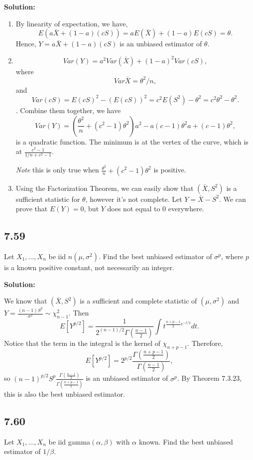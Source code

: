 \documentclass[11pt]{article}
\newcommand{\Sol}{\par {\bf Solution:}}
\newcommand{\sample}[1]{#1_1 , \dots , #1_n}
\begin{document}
\Sol
\begin{enumerate}[label=(\alph*)]
    \item
    By linearity of expectation, we have,
    \[
    E(a\bar X + (1-a)(cS)) = aE(\bar X) + (1-a)E(cS) = \theta.
    \]
    Hence, $Y = a\bar X + (1-a)(cS)$ is an unbiased estimator of $\theta$.
    
    \item
    \[
    Var(Y) = a^2 Var(\bar X) + (1-a)^2Var(cS),
    \]
    where
    \[
    Var \bar X = \theta^2/n,
    \]
    and 
    \[
    Var(cS) = E(cS)^2 - (E(cS))^2 = c^2E(S^2) - \theta^2 = c^2\theta^2 - \theta^2.
    \].
    Combine them together, we have
    \[
    Var(Y) = (\frac{\theta^2}{n} + (c^2-1)\theta^2)a^2 - a(c-1)\theta^2a + (c-1)\theta^2,
    \]
    is a quadratic function.
    The minimum is at the vertex of the curve, which is at $\frac{c^2-1}{1/n + c^2 - 1}$.

    \emph{Note} this is only true when $\frac{\theta^2}{n} + (c^2-1)\theta^2$ is positive.
    \item
    Using the Factorization Theorem, we can easily show that $(\bar X, S^2)$ is a sufficient statistic for $\theta$, however it's not complete. Let $Y = \bar X - S^2$. We can prove that $E(Y) = 0$, but $Y$ does not equal to 0 everywhere.
\end{enumerate}

\subsection*{7.59}
Let $\sample X$ be iid $n(\mu, \sigma^2)$. Find the best unbiased estimator of $\sigma^p$, where $p$ is a known positive constant, not necessarily an integer.

\Sol

We know that $(\bar X, S^2)$ is a sufficient and complete statistic of $(\mu, \sigma^2)$ and $Y = \frac{(n-1)S^2}{\sigma^2} \sim \chi_{n-1}^2$.
Then
\[
E [Y^{p/2}] = \frac{1}{2^{(n-1)/2}\Gamma(\frac{n-1}{2})} \int t^{\frac{n+p-1}{2}e^{-t/2}}dt.
\]
Notice that the term in the integral is the kernel of $\chi_{n+p-1}$. Therefore, 
\[
E[Y^{p/2}] = 2^{p/2}\frac{\Gamma(\frac{n+p-1}{2})}{\Gamma(\frac{n-1}{2})},
\]
so $(n-1)^{p/2}S^p\frac{\Gamma(\frac{n-1}{2})}{\Gamma(\frac{n+p-1}{2})}$ is an unbiased estimator of $\sigma^p$. By Theorem 7.3.23, this is also the best unbiased estimator.

\subsection*{7.60}
Let $\sample X$ be iid gamma$(\alpha, \beta)$ with $\alpha$ known. Find the best unbiased estimator of $1/\beta$.
\end{document}
